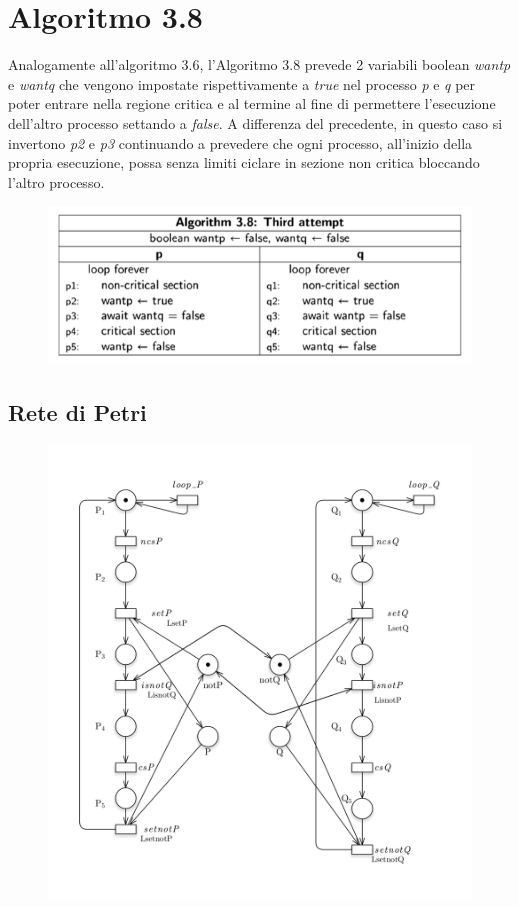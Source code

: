 \documentclass{article}
\begin{document}
\section{Algoritmo 3.8}
Analogamente all'algoritmo 3.6, l'Algoritmo 3.8 prevede 2 variabili boolean \textit{wantp} e \textit{wantq} che vengono impostate rispettivamente a \textit{true} nel processo \textit{p} e \textit{q} per poter entrare nella regione critica e al termine al fine di permettere l'esecuzione dell'altro processo settando a \textit{false}. A differenza del precedente, in questo caso si invertono \textit{p2} e \textit{p3} continuando a prevedere che ogni processo, all'inizio della propria esecuzione, possa senza limiti ciclare in sezione non critica bloccando l'altro processo. 
\begin{figure}[h] 
\centering
\includegraphics[scale=0.6]{3.8.png}
\end{figure}
\clearpage
\subsection{Rete di Petri}
\begin{figure}[h] 
\centering
\includegraphics[scale=0.4]{3.8PT.png}
\end{figure}
\end{document}
